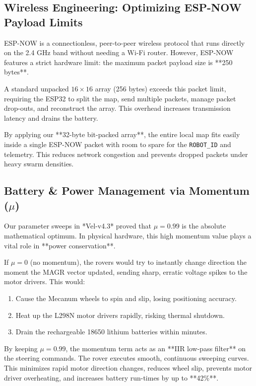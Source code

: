 \documentclass[letterpaper, 10pt, conference]{IEEEtran}
\begin{document}
\subsection{Wireless Engineering: Optimizing ESP-NOW Payload Limits}
ESP-NOW is a connectionless, peer-to-peer wireless protocol that runs directly on the 2.4 GHz band without needing a Wi-Fi router. However, ESP-NOW features a strict hardware limit: the maximum packet payload size is **250 bytes**.

A standard unpacked $16 \times 16$ array (256 bytes) exceeds this packet limit, requiring the ESP32 to split the map, send multiple packets, manage packet drop-outs, and reconstruct the array. This overhead increases transmission latency and drains the battery. 

By applying our **32-byte bit-packed array**, the entire local map fits easily inside a single ESP-NOW packet with room to spare for the \texttt{ROBOT\_ID} and telemetry. This reduces network congestion and prevents dropped packets under heavy swarm densities.

\subsection{Battery \& Power Management via Momentum ($\mu$)}
Our parameter sweeps in *Vel-v4.3* proved that $\mu=0.99$ is the absolute mathematical optimum. In physical hardware, this high momentum value plays a vital role in **power conservation**.

If $\mu = 0$ (no momentum), the rovers would try to instantly change direction the moment the MAGR vector updated, sending sharp, erratic voltage spikes to the motor drivers. This would:
\begin{enumerate}
    \item Cause the Mecanum wheels to spin and slip, losing positioning accuracy.
    \item Heat up the L298N motor drivers rapidly, risking thermal shutdown.
    \item Drain the rechargeable 18650 lithium batteries within minutes.
\end{enumerate}

By keeping $\mu = 0.99$, the momentum term acts as an **IIR low-pass filter** on the steering commands. The rover executes smooth, continuous sweeping curves. This minimizes rapid motor direction changes, reduces wheel slip, prevents motor driver overheating, and increases battery run-times by up to **42\%**.
\end{document}
